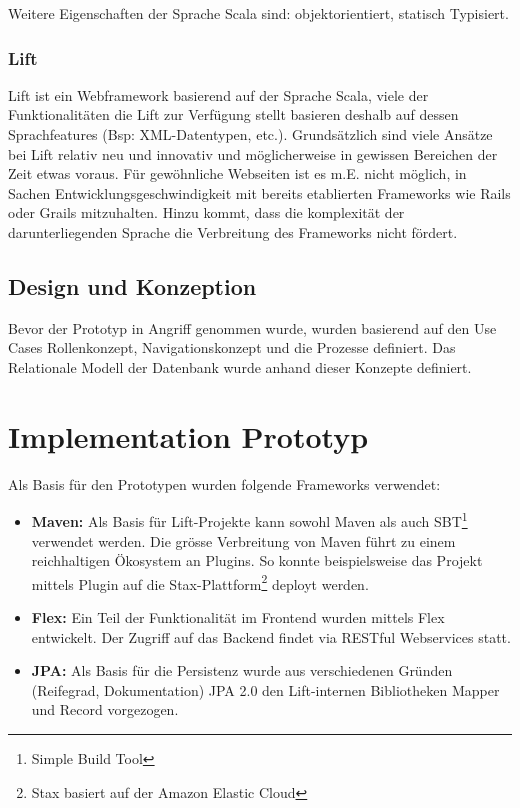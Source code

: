 Weitere Eigenschaften der Sprache Scala sind: objektorientiert, statisch Typisiert.
\subsubsection{Lift}
Lift ist ein Webframework basierend auf der Sprache Scala, viele der Funktionalit\"aten die Lift zur Verf\"ugung stellt basieren deshalb auf dessen Sprachfeatures (Bsp: XML-Datentypen, etc.). Grunds\"atzlich sind viele Ans\"atze bei Lift relativ neu und innovativ und m\"oglicherweise in gewissen Bereichen der Zeit etwas voraus. F\"ur gew\"ohnliche Webseiten ist es m.E. nicht m\"oglich, in Sachen Entwicklungsgeschwindigkeit mit bereits etablierten Frameworks wie Rails oder Grails mitzuhalten. Hinzu kommt, dass die komplexit\"at der darunterliegenden Sprache die Verbreitung des Frameworks nicht f\"ordert. 

\subsection{Design und Konzeption}
Bevor der Prototyp in Angriff genommen wurde, wurden basierend auf den Use Cases Rollenkonzept, Navigationskonzept und die Prozesse definiert. Das Relationale Modell der Datenbank wurde anhand dieser Konzepte definiert. 

\section{Implementation Prototyp}
Als Basis f\"ur den Prototypen wurden folgende Frameworks verwendet:
\begin{itemize}
\item \textbf{Maven: } Als Basis f\"ur Lift-Projekte kann sowohl Maven als auch SBT\footnote{Simple Build Tool} verwendet werden. Die gr\"osse Verbreitung von Maven f\"uhrt zu einem reichhaltigen \"Okosystem an Plugins. So konnte beispielsweise das Projekt mittels Plugin auf die Stax-Plattform\footnote{Stax basiert auf der Amazon Elastic Cloud} deployt werden.
\item \textbf{Flex: }Ein Teil der Funktionalit\"at im Frontend wurden mittels Flex entwickelt. Der Zugriff auf das Backend findet via RESTful Webservices statt.
\item \textbf{JPA: } Als Basis f\"ur die Persistenz wurde aus verschiedenen Gr\"unden (Reifegrad, Dokumentation) JPA 2.0 den Lift-internen Bibliotheken Mapper und Record vorgezogen.
\end{itemize}

